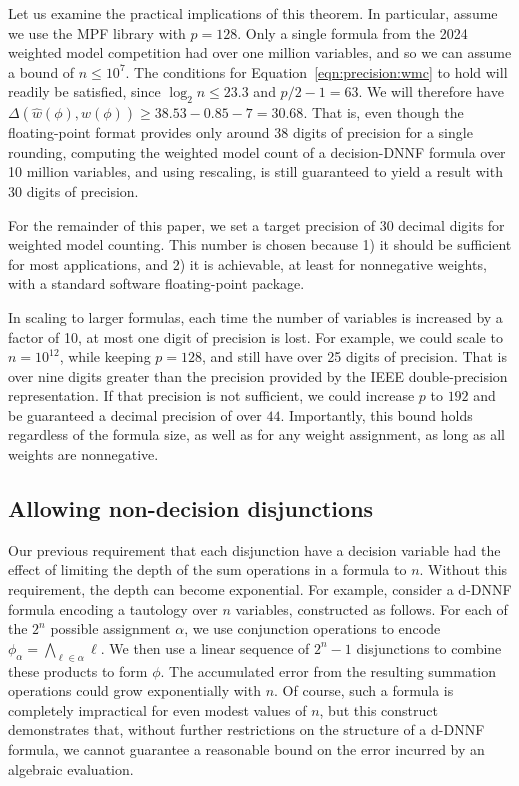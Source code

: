 \documentclass[letterpaper,USenglish,cleveref, autoref, thm-restate]{lipics-v2021}
\newcommand{\lit}{\ell}
\newcommand{\approximate}[1]{\hat{#1}}
\newcommand{\approxw}{\approximate{w}}
\newcommand{\digitprecision}{\Delta}
\newcommand{\assign}{\alpha}
\begin{document}
Let us examine the practical implications of this theorem.  In
particular, assume we use the MPF library with $p=128$.  Only a single
formula from the 2024 weighted model competition had over one million
variables, and so we can assume a bound of $n \leq 10^7$.  The
conditions for Equation~\ref{eqn:precision:wmc} to hold will readily
be satisfied, since $\log_2 n \leq 23.3$ and $p/2-1 = 63$.  We will
therefore have $\digitprecision(\approxw(\phi), w(\phi)) \geq 38.53 -
0.85 - 7 = 30.68$.  That is, even though the floating-point format
provides only around 38 digits of precision for a single rounding,
computing the weighted model count of a decision-DNNF formula over 10
million variables, and using rescaling, is still guaranteed to yield a
result with 30 digits of precision.

For the remainder of this paper, we set a target precision of 30 decimal digits for
weighted model counting.  This number is chosen because 1) it should be
sufficient for most applications, and 2) it
is achievable, at least for nonnegative weights, with a standard software floating-point package.

In scaling to larger formulas, each time
the number of variables is increased by a factor of 10, at most one
digit of precision is lost.  For example, we could scale to $n=10^{12}$, while keeping $p=128$, and still have over 25 digits of precision.  That is over nine digits greater than the precision
provided by the IEEE double-precision representation.  If that precision is not sufficient, we could increase $p$ to $192$ and be guaranteed a decimal precision of over $44$.
Importantly, this bound holds regardless of the formula size, as well as for any weight assignment, 
as long as all weights are nonnegative.

\subsection{Allowing non-decision disjunctions}
\label{sect:ddnnf}

Our previous requirement that each disjunction have a decision
variable had the effect of limiting the depth of the sum operations in
a formula to $n$.  Without this requirement, the depth can become
exponential.  For example, consider a d-DNNF formula encoding a
tautology over $n$ variables, constructed as follows.  For each of the
$2^n$ possible assignment $\assign$, we use conjunction operations to
encode $\phi_{\assign} = \bigwedge_{\lit \in \assign} \lit$.  We then
use a linear sequence of $2^n-1$ disjunctions to combine these products to
form $\phi$.  The accumulated error from the resulting summation operations could grow
exponentially with $n$.  Of course, such a formula is completely
impractical for even modest values of $n$, but this construct
demonstrates that, without further restrictions on the structure of a
d-DNNF formula, we cannot guarantee a reasonable bound on the error incurred by an algebraic evaluation.
\end{document}
